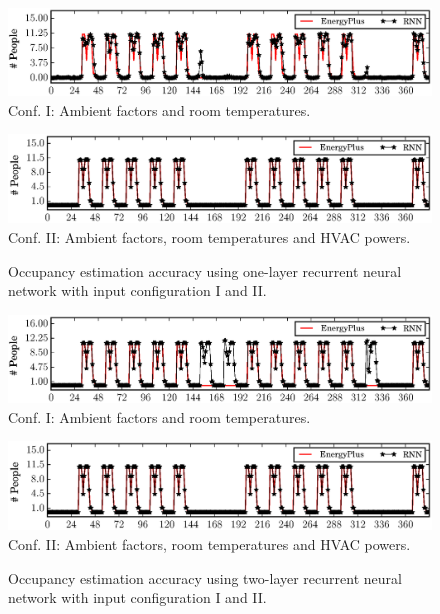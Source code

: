 \begin{figure}[h]
\begin{minipage}{\textwidth}
\centering\includegraphics[width=5in]{figs/results/1LRoomTOnlyDPFAugW3-4}
Conf. I: Ambient factors and room temperatures.
\end{minipage}
\hfill

\vspace{3ex}

\noindent\begin{minipage}{\textwidth}
\centering\includegraphics[width=5in]{figs/results/1LAmbHVACDPFAugW3-4}
Conf. II: Ambient factors, room temperatures and HVAC powers.
\end{minipage}
\hfill
\caption{Occupancy estimation accuracy using one-layer recurrent neural network with input configuration I and II.}\label{fig:one-layer}
\end{figure}

\begin{figure}[h]

\begin{minipage}{\textwidth}
\centering\includegraphics[width=5in]{figs/results/2LRoomTOnlyDPFAugW3-4}
Conf. I: Ambient factors and room temperatures.
\end{minipage}
\hfill

\vspace{3ex}

\noindent\begin{minipage}{\textwidth}
\centering\includegraphics[width=5in]{figs/results/2LAmbHVACDPFAugW3-4}
Conf. II: Ambient factors, room temperatures and HVAC powers.
\end{minipage}
\hfill
\caption{Occupancy estimation accuracy using two-layer recurrent neural network with input configuration I and II.}\label{fig:two-layer}
\end{figure}


